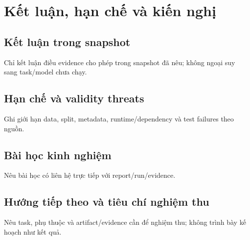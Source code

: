 \chapter{Kết luận, hạn chế và kiến nghị}
\section{Kết luận trong snapshot}
Chỉ kết luận điều evidence cho phép trong snapshot đã nêu; không ngoại suy sang task/model chưa chạy.
\section{Hạn chế và validity threats}
Ghi giới hạn data, split, metadata, runtime/dependency và test failures theo nguồn.
\section{Bài học kinh nghiệm}
Nêu bài học có liên hệ trực tiếp với report/run/evidence.
\section{Hướng tiếp theo và tiêu chí nghiệm thu}
Nêu task, phụ thuộc và artifact/evidence cần để nghiệm thu; không trình bày kế hoạch như kết quả.